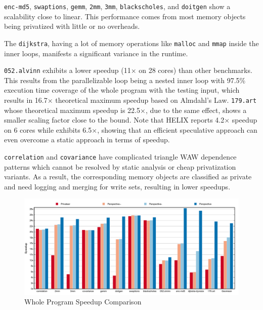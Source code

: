 \texttt{enc-md5}, \texttt{swaptions}, \texttt{gemm}, \texttt{2mm},
\texttt{3mm}, \texttt{blackscholes}, and \texttt{doitgen} show a
scalability close to linear. This performance comes from most memory
objects being privatized with little or no overheads.

The \texttt{dijkstra}, having a lot of memory operations like
\texttt{malloc} and \texttt{mmap} inside the inner loops, manifests a
significant variance in the runtime.

\texttt{052.alvinn} exhibits a lower speedup (11$\times$ on 28
cores) than other benchmarks. This results from the parallelizable loop
being a nested inner loop with 97.5\% execution time coverage of the whole
program with the testing input, which results in 16.7$\times$
theoretical maximum speedup based on Almdahl's Law.
\texttt{179.art} whose theoretical maximum speedup is 22.5$\times$, due to
the same effect, shows a smaller scaling factor close to the bound. Note
that HELIX\cite{simone:12:cgo} reports 4.2$\times$ speedup on 6 cores while
\name exhibits 6.5$\times$, showing that an efficient speculative approach
can even overcome a static approach in terms of speedup.

\texttt{correlation} and \texttt{covariance} have complicated triangle WAW
dependence patterns which cannot be resolved by static analysis or cheap
privatization variants. As a result, the corresponding memory objects are
classified as private and need logging and merging for write sets,
resulting in lower speedups.

\begin{figure}[ht]
  \includegraphics[width=\textwidth]{figures/compare-privateer}
  \caption{Whole Program Speedup Comparison}
  \label{fig:speedup-compare}
\end{figure}


